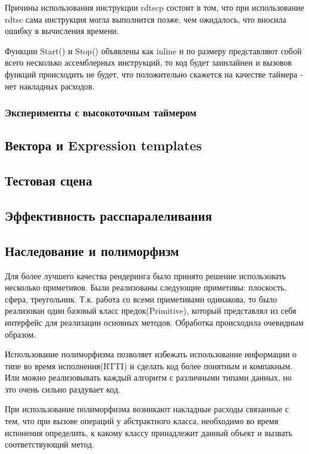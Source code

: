 \documentclass[12pt, a4paper]{article}
\begin{document}
Причины использования инструкции rdtscp состоит в том, что при использование rdtsc сама инструкция могла выполнится позже, чем ожидалось, что вносила ошибку в вычисления времени.

Функции Start() и Stop() объявлены как inline и по размеру представляют собой всего несколько ассемблерных инструкций, то код будет заинлайнен и вызовов функций происходить не будет, что положительно скажется на качестве таймера - нет накладных расходов.


\subsubsection{Эксперименты с высокоточным таймером}

\subsection{Вектора и Expression templates}

\subsection{Тестовая сцена}

\subsection{Эффективность расспаралеливания}



\subsection{Наследование и полиморфизм}

Для более лучшего качества рендеринга было принято решение использовать несколько приметивов. Были реализованы следующие приметивы: плоскость, сфера, треугольник. Т.к. работа со всеми приметивами одинакова, то было реализован один базовый класс предок(Primitive), который представлял из себя интерфейс для реализации основных методов. Обработка происходила очевидным образом. 

Использование полиморфизма позволяет избежать использование информации о типе во время исполнения(RTTI) и сделать код более понятным и компакным. Или можно реализовывать каждый алгоритм с различными типами данных, но это очень сильно раздувает код.

При использование полиморфизма возникают накладные расходы связанные с тем, что при вызове операций у абстрактного класса, необходимо во время испонения определить, к какому классу принадлежит данный объект и вызвать соответствующий метод. 
\end{document}
